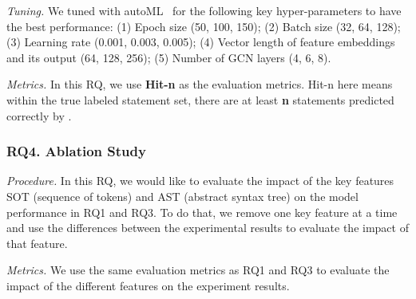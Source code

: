 {\em Tuning.} We tuned {\tool} with autoML~\cite{NNI} for the following key hyper-parameters to have the best performance: (1) Epoch size (50, 100, 150); (2) Batch size (32, 64, 128); (3) Learning rate (0.001, 0.003, 0.005); (4) Vector length of feature embeddings and its output (64, 128, 256); (5) Number of GCN layers (4, 6, 8).

{\em Metrics.} In this RQ, we use \textbf{Hit-n} as the evaluation metrics. Hit-n here means within the true labeled statement set, there are at least \textbf{n} statements predicted correctly by \tool.

\subsubsection{RQ4. Ablation Study}

{\em Procedure.} In this RQ, we would like to evaluate the impact of the key features SOT (sequence of tokens) and AST (abstract syntax tree) on the model performance in RQ1 and RQ3. To do that, we remove one key feature at a time and use the differences between the experimental results to evaluate the impact of that feature.

{\em Metrics.} We use the same evaluation metrics as RQ1 and RQ3 to evaluate the impact of the different features on the experiment results.
